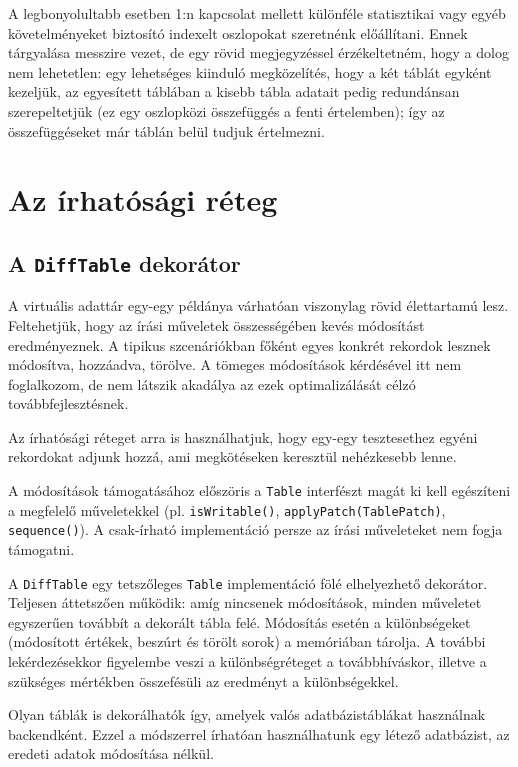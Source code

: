 \documentclass[
    parspace,
    noindent,
    nohyp,
]{elteiktdk}[2023/04/10]
\begin{document}
A legbonyolultabb esetben 1:n kapcsolat mellett különféle statisztikai
vagy egyéb követelményeket biztosító indexelt oszlopokat szeretnénk előállítani.
Ennek tárgyalása messzire vezet,
de egy rövid megjegyzéssel érzékeltetném, hogy a dolog nem lehetetlen:
egy lehetséges kiinduló megközelítés, hogy a két táblát egyként kezeljük,
az egyesített táblában a kisebb tábla adatait pedig redundánsan szerepeltetjük
(ez egy oszlopközi összefüggés a fenti értelemben);
így az összefüggéseket már táblán belül tudjuk értelmezni.

\section{Az írhatósági réteg}

\subsection{A \texttt{DiffTable} dekorátor}

A virtuális adattár egy-egy példánya várhatóan viszonylag rövid élettartamú lesz.
Feltehetjük, hogy az írási műveletek összességében kevés módosítást eredményeznek.
A tipikus szcenáriókban főként egyes konkrét rekordok lesznek módosítva, hozzáadva, törölve.
A tömeges módosítások kérdésével itt nem foglalkozom,
de nem látszik akadálya az ezek optimalizálását célzó továbbfejlesztésnek.

Az írhatósági réteget arra is használhatjuk,
hogy egy-egy tesztesethez egyéni rekordokat adjunk hozzá,
ami megkötéseken keresztül nehézkesebb lenne.

A módosítások támogatásához előszöris a \texttt{Table} interfészt magát
ki kell egészíteni a megfelelő műveletekkel
(pl. \texttt{isWritable()}, \texttt{applyPatch(TablePatch)}, \texttt{sequence()}).
A csak-írható implementáció persze az írási műveleteket nem fogja támogatni.

A \texttt{DiffTable} egy tetszőleges \texttt{Table} implementáció fölé elhelyezhető dekorátor.
Teljesen áttetszően működik: amíg nincsenek módosítások,
minden műveletet egyszerűen továbbít a dekorált tábla felé.
Módosítás esetén a különbségeket (módosított értékek, beszúrt és törölt sorok) a memóriában tárolja.
A további lekérdezésekkor figyelembe veszi a különbségréteget a továbbhíváskor,
illetve a szükséges mértékben összefésüli az eredményt a különbségekkel.

Olyan táblák is dekorálhatók így, amelyek valós adatbázistáblákat használnak backendként.
Ezzel a módszerrel írhatóan használhatunk egy létező adatbázist,
az eredeti adatok módosítása nélkül.
\end{document}
